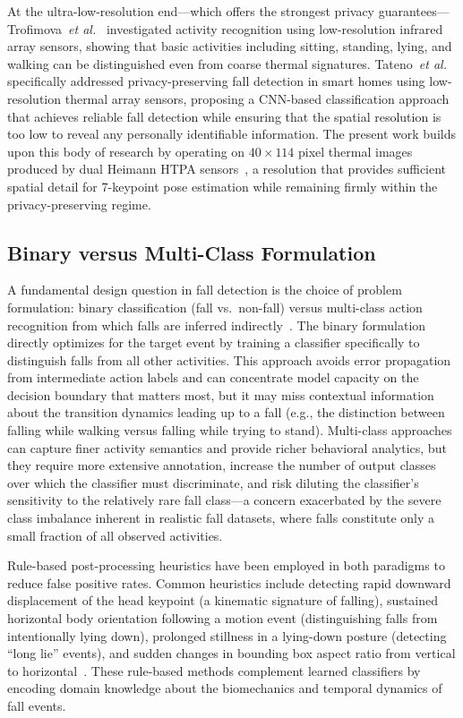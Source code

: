 At the ultra-low-resolution end---which offers the strongest privacy guarantees---Trofimova~\emph{et al.}~\cite{trofimova2017indoor} investigated activity recognition using low-resolution infrared array sensors, showing that basic activities including sitting, standing, lying, and walking can be distinguished even from coarse thermal signatures. Tateno~\emph{et al.}~\cite{tateno2020privacy} specifically addressed privacy-preserving fall detection in smart homes using low-resolution thermal array sensors, proposing a CNN-based classification approach that achieves reliable fall detection while ensuring that the spatial resolution is too low to reveal any personally identifiable information. The present work builds upon this body of research by operating on $40 \times 114$ pixel thermal images produced by dual Heimann HTPA sensors~\cite{heimann2024htpa}, a resolution that provides sufficient spatial detail for 7-keypoint pose estimation while remaining firmly within the privacy-preserving regime.

\subsection*{Binary versus Multi-Class Formulation}

A fundamental design question in fall detection is the choice of problem formulation: binary classification (fall vs.\ non-fall) versus multi-class action recognition from which falls are inferred indirectly~\cite{wang2020elderly}. The binary formulation directly optimizes for the target event by training a classifier specifically to distinguish falls from all other activities. This approach avoids error propagation from intermediate action labels and can concentrate model capacity on the decision boundary that matters most, but it may miss contextual information about the transition dynamics leading up to a fall (e.g., the distinction between falling while walking versus falling while trying to stand). Multi-class approaches~\cite{zhang2012rgb} can capture finer activity semantics and provide richer behavioral analytics, but they require more extensive annotation, increase the number of output classes over which the classifier must discriminate, and risk diluting the classifier's sensitivity to the relatively rare fall class---a concern exacerbated by the severe class imbalance inherent in realistic fall datasets, where falls constitute only a small fraction of all observed activities.

Rule-based post-processing heuristics have been employed in both paradigms to reduce false positive rates. Common heuristics include detecting rapid downward displacement of the head keypoint (a kinematic signature of falling), sustained horizontal body orientation following a motion event (distinguishing falls from intentionally lying down), prolonged stillness in a lying-down posture (detecting ``long lie'' events), and sudden changes in bounding box aspect ratio from vertical to horizontal~\cite{charfi2013optimized, rougier2011robust}. These rule-based methods complement learned classifiers by encoding domain knowledge about the biomechanics and temporal dynamics of fall events.

